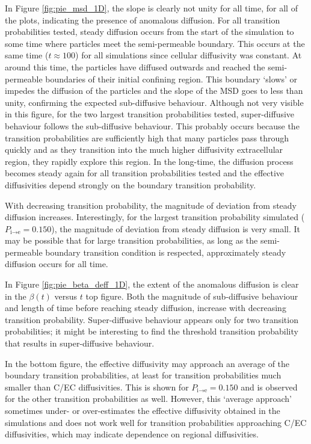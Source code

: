 	 In Figure \ref{fig:pie_msd_1D}, the slope is clearly not unity for all time, for all of the plots, indicating the presence of anomalous diffusion. For all transition probabilities tested, steady diffusion occurs from the start of the simulation to some time where particles meet the semi-permeable boundary. This occurs at the same time ($ t \approx 100 $) for all simulations since cellular diffusivity was constant. At around this time, the particles have diffused outwards and reached the semi-permeable boundaries of their initial confining region. This boundary `slows' or impedes the diffusion of the particles and the slope of the MSD goes to less than unity, confirming the expected sub-diffusive behaviour. Although not very visible in this figure, for the two largest transition probabilities tested, super-diffusive behaviour follows the sub-diffusive behaviour. This probably occurs because the transition probabilities are sufficiently high that many particles pass through quickly and as they transition into the much higher diffusivity extracellular region, they rapidly explore this region. In the long-time, the diffusion process becomes steady again for all transition probabilities tested and the effective diffusivities depend strongly on the boundary transition probability. 
	 
	 With decreasing transition probability, the magnitude of deviation from steady diffusion increases. Interestingly, for the largest transition probability simulated ($ P_{\textrm{i} \rightarrow \textrm{e}} = 0.150 $), the magnitude of deviation from steady diffusion is very small. It may be possible that for large transition probabilities, as long as the semi-permeable boundary transition condition is respected, approximately steady diffusion occurs for all time. 
	 
	 In Figure \ref{fig:pie_beta_deff_1D}, the extent of the anomalous diffusion is clear in the $ \beta (t) $ versus $ t $ top figure. Both the magnitude of sub-diffusive behaviour and length of time before reaching steady diffusion, increase with decreasing transition probability. Super-diffusive behaviour appears only for two transition probabilities; it might be interesting to find the threshold transition probability that results in super-diffusive behaviour.
	 
	 In the bottom figure, the effective diffusivity may approach an average of the boundary transition probabilities, at least for transition probabilities much smaller than C/EC diffusivities. This is shown for $ P_{\textrm{i} \rightarrow \textrm{e}} = 0.150 $ and is observed for the other transition probabilities as well. However, this `average approach' sometimes under- or over-estimates the effective diffusivity obtained in the simulations and does not work well for transition probabilities approaching C/EC diffusivities, which may indicate dependence on regional diffusivities.
	

